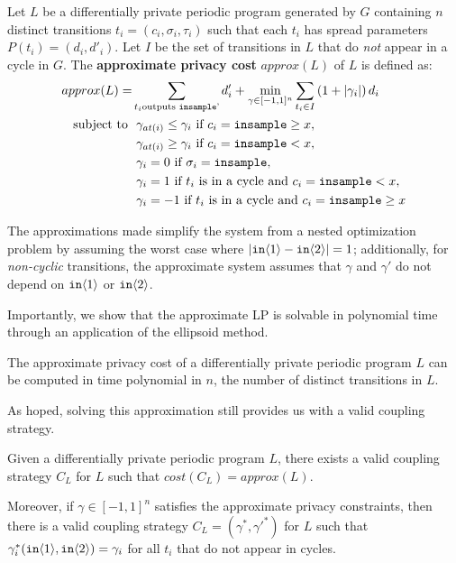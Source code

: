 \begin{defn}
    Let $L$ be a differentially private periodic program generated by $G$ containing $n$ distinct transitions $t_i = (c_i, \sigma_i, \tau_i)$ such that each $t_i$ has spread parameters $P(t_i) = (d_i, d'_i)$.
    Let $I$ be the set of transitions in $L$ that do \textit{not} appear in a cycle in $G$. The \textbf{approximate privacy cost} $approx(L)$ of $L$ is defined as:
    \begin{align*} 
        approx(L) = &\sum_{t_i \text{outputs \texttt{insample}'}} d_i' + \min_{\gamma \in [-1, 1]^n} \sum_{t_i \in I} \left(1 + |\gamma_i| \right) d_i  \\
            \text{subject to } 
            &\ \gamma_{at(i)} \leq \gamma_i \text{ if } c_i = \texttt{insample}\geq x, \\
            &\ \gamma_{at(i)} \geq \gamma_i \text{ if } c_i = \texttt{insample} < x, \\
            &\ \gamma_i = 0 \text{ if } \sigma_i = \texttt{insample}, \\
            &\ \gamma_i = 1 \text{ if } t_i \text{ is in a cycle and } c_i = \texttt{insample} < x,\\ 
            &\ \gamma_i = -1 \text{ if } t_i \text{ is in a cycle and } c_i = \texttt{insample}\geq x
    \end{align*}
\end{defn}
The approximations made simplify the system from a nested optimization problem by assuming the worst case where $|\texttt{in}\langle1 \rangle - \texttt{in}\langle2 \rangle| = 1$; additionally, for \textit{non-cyclic} transitions, the approximate system assumes that $\gamma$ and $\gamma'$ do not depend on $\texttt{in}\langle1 \rangle$ or $\texttt{in}\langle2 \rangle$. 

Importantly, we show that the approximate LP is solvable in polynomial time through an application of the ellipsoid method.

\begin{prop}\label{approximateSolutionPolyTimeProp}
    The approximate privacy cost of a differentially private periodic program $L$ can be computed in time polynomial in $n$, the number of distinct transitions in $L$.
\end{prop}

As hoped, solving this approximation still provides us with a valid coupling strategy.

\begin{prop}
    \label{prop:approx_exists}
    Given a differentially private periodic program $L$, there exists a valid coupling strategy $C_L$ for $L$ such that $cost(C_L) = approx(L)$.

    Moreover, if $\gamma \in [-1, 1]^n$ satisfies the approximate privacy constraints, then there is a valid coupling strategy $C_L = (\gamma^*, {\gamma'}^*)$ for $L$ such that $\gamma_i^*(\texttt{in}\langle1 \rangle, \texttt{in}\langle2 \rangle) = \gamma_i$ for all $t_i$ that do not appear in cycles. 
\end{prop}

